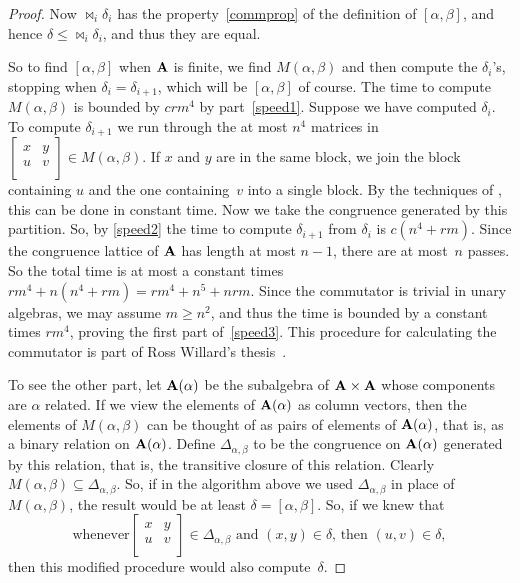 \begin{proof}
Now $\Join_i \delta_i$ has the property~\eqref{commprop} of the
definition of $[\alpha,\beta]$,
and hence $\delta \le \Join_i \delta_i$, and thus they are equal.

So to find $[\alpha,\beta]$ when $\mathbf{A}$ is finite, we find
$M(\alpha,\beta)$ and then compute the $\delta_i$'s, stopping when
$\delta_i = \delta_{i+1}$, which will be $[\alpha,\beta]$ of course.
The time to compute $M(\alpha,\beta)$ is bounded by $crm^4$ by
part~\eqref{speed1}. Suppose we have computed $\delta_i$. To
compute $\delta_{i+1}$ we run through the at most $n^4$ matrices
in
$\begin{bmatrix}
x & y \\
u & v\\
\end{bmatrix} \in M(\alpha,\beta)$. If $x$ and $y$ are in the same
block, we join the block containing $u$ and the one containing~$v$
into a single block. By the techniques of \cite{Freese2008},
this can be done in constant time. Now we take the congruence generated
by this partition. So, by \eqref{speed2} the time to compute
$\delta_{i+1}$ from $\delta_i$ is $c(n^4 + rm)$. Since the congruence
lattice of $\mathbf{A}$ has length at most $n-1$, there are at most~$n$
passes. So the total time is at most a constant times
$rm^4 + n(n^4 + rm) = rm^4 + n^5 + nrm$.
Since the commutator is trivial in unary algebras, we may
assume $m \ge n^2$, and thus the time is bounded by a
constant times $rm^4$, proving the first part of~\eqref{speed3}.
This procedure for calculating the commutator is part
of Ross Willard's thesis~\cite{MR2637477}.

To see the other part,
let $\mathbf{A}(\alpha)$ be the subalgebra
of $\mathbf{A} \times \mathbf{A}$ whose components are $\alpha$ related. If we
view the elements of $\mathbf{A}(\alpha)$ as column vectors, then the
elements of $M(\alpha,\beta)$ can be thought of as pairs of elements
of $\mathbf{A}(\alpha)$, that is, as a binary relation on $\mathbf{A}(\alpha)$.
Define $\Delta_{\alpha,\beta}$ to be the congruence on $\mathbf{A}(\alpha)$
generated by this relation, that is,
the transitive closure of this relation.
Clearly $M(\alpha,\beta) \subseteq
\Delta_{\alpha,\beta}$. So, if in the algorithm above we used
$\Delta_{\alpha,\beta}$ in place of $M(\alpha,\beta)$, the result
would be at least $\delta = [\alpha,\beta]$. So, if we knew that
\begin{equation}\label{deltaStatement}
\text{whenever
$\begin{bmatrix}
x & y \\
u & v\\
\end{bmatrix} \in \Delta_{\alpha,\beta}$ and $(x,y) \in \delta$,
then $(u,v) \in \delta$},
\end{equation}
then this modified procedure would also
compute~$\delta$.


\end{proof}
